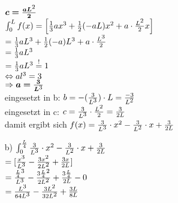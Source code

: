 \documentclass[a4paper]{article}
\begin{document}
\begin{description}
\begin{itemize}
									$\boldsymbol{c=\frac{aL\textsuperscript{2}}{2}}$\\
									
									$\int_0^L f(x)= \left[\frac{1}{3}ax\textsuperscript{3}+\frac{1}{2}(-aL)x\textsuperscript{2}+a\cdot \frac{L\textsuperscript{2}}{2}x\right]$\\
									
									$=\frac{1}{3}aL\textsuperscript{3} + \frac{1}{2}(-a)L\textsuperscript{3} + a\cdot \frac{L\textsuperscript{3}}{2}$\\
									
									$=\frac{1}{3}aL\textsuperscript{3}$\\
									
									$=\frac{1}{3}aL\textsuperscript{3} \stackrel{!}{=} 1$\\
									
									$\Leftrightarrow al\textsuperscript{3}=3$\\
									
									$\Rightarrow \boldsymbol{a=\frac{3}{L\textsuperscript{3}}}$\\
									
									eingesetzt in b:
									$b=-(\frac{3}{L\textsuperscript{3}})\cdot L = \frac{-3}{L\textsuperscript{2}}$\\
									
									eingesetzt in c:
									$c=\frac{3}{L\textsuperscript{3}}\cdot \frac{L\textsuperscript{2}}{2}=\frac{3}{2L}$\\
									damit ergibt sich $f(x)=\frac{3}{L\textsuperscript{3}} \cdot x\textsuperscript{2}- \frac{3}{L\textsuperscript{2}} \cdot x + \frac{3}{2L}$\\
									
				\item[b)] $\int_0^\frac{L}{4} \frac{3}{L\textsuperscript{3}} \cdot x\textsuperscript{2}- \frac{3}{L\textsuperscript{2}} \cdot x + \frac{3}{2L}$\\
				
									$=[\frac{x\textsuperscript{3}}{L\textsuperscript{3}}-\frac{3x\textsuperscript{2}}{2L\textsuperscript{2}}+\frac{3x}{2L}]$\\
									
									$=\frac{\frac{L}{4}\textsuperscript{3}}{L\textsuperscript{3}} - \frac{3\frac{L}{4}\textsuperscript{2}}{2L\textsuperscript{2}} + \frac{3\frac{L}{4}}{2L} - 0$\\
									
									$=\frac{L\textsuperscript{3}}{64L\textsuperscript{3}} - \frac{3L\textsuperscript{2}}{32L\textsuperscript{2}} + \frac{3L}{8L}$\\
									

\end{itemize}
\end{description}
\end{document}

